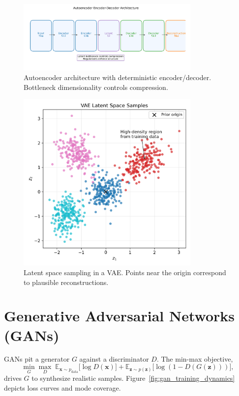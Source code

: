 \documentclass{article}
\begin{document}
\begin{figure}[H]
  \centering
  \includegraphics[width=0.8\textwidth]{autoencoder_architecture.png}
  \caption{Autoencoder architecture with deterministic encoder/decoder. Bottleneck dimensionality controls compression.}
  \label{fig:autoencoder_architecture}
\end{figure}

\begin{figure}[H]
  \centering
  \includegraphics[width=0.8\textwidth]{vae_latent_space.png}
  \caption{Latent space sampling in a VAE. Points near the origin correspond to plausible reconstructions.}
  \label{fig:vae_latent_space}
\end{figure}
\FloatBarrier

\section{Generative Adversarial Networks (GANs)}
GANs pit a generator $G$ against a discriminator $D$. The min-max objective,
\begin{equation}
  \min_{G} \max_{D} \; \mathbb{E}_{\mathbf{x} \sim p_{\mathrm{data}}} \bigl[\log D(\mathbf{x})\bigr] + \mathbb{E}_{\mathbf{z} \sim p(\mathbf{z})} \bigl[\log (1 - D(G(\mathbf{z})))\bigr],
\end{equation}
drives $G$ to synthesize realistic samples. Figure~\ref{fig:gan_training_dynamics} depicts loss curves and mode coverage.
\end{document}
